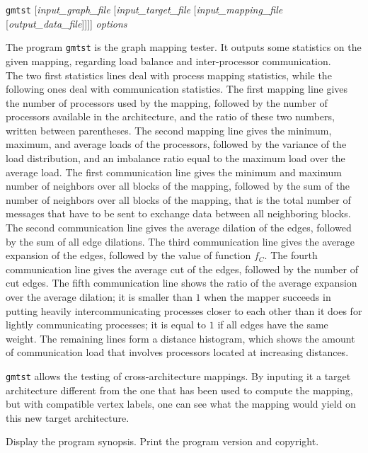 \begin{itemize}
\progsyn
\texttt{gmtst} [{\it input\_graph\_file} [{\it input\_\lbt target\_\lbt file} [{\it input\_\lbt mapping\_\lbt file} [{\it output\_\lbt data\_\lbt file}]]]] {\it options}

\progdes
The program \texttt{gmtst} is the graph mapping tester. It outputs some
statistics on the given mapping, regarding load balance and inter-processor
communication.
\\
The two first statistics lines deal with process mapping statistics, while
the following ones deal with communication statistics.
The first mapping line gives the number of processors used by
the mapping, followed by the number of processors available in the
architecture, and the ratio of these two numbers, written between parentheses.
The second mapping line gives the minimum, maximum, and average loads of the
processors, followed by the variance of the load distribution, and an imbalance
ratio equal to the maximum load over the average load.
The first communication line gives the minimum and maximum number of neighbors
over all blocks of the mapping, followed by the sum of the number of neighbors
over all blocks of the mapping, that is the total number of messages
that have to be sent to exchange data between all neighboring blocks.
The second communication line gives the average dilation of the edges,
followed by the sum of all edge dilations.
The third communication line gives the average expansion of the edges,
followed by the value of function $f_C$.
The fourth communication line gives the average cut of the edges,
followed by the number of cut edges.
The fifth communication line shows the ratio of the average expansion over
the average dilation; it is smaller than $1$ when the mapper succeeds in
putting heavily intercommunicating processes closer to each other than it
does for lightly communicating processes; it is equal to $1$ if all edges
have the same weight.
The remaining lines form a distance histogram, which shows the amount of
communication load that involves processors located at increasing distances.

\texttt{gmtst} allows the testing of cross-architecture mappings. By inputing it
a target architecture different from the one that has been used to compute the
mapping, but with compatible vertex labels, one can see what the mapping
would yield on this new target architecture.

\progopt
\begin{itemize}
\iteme[\texttt{-h}]
Display the program synopsis.
\iteme[\texttt{-V}]
Print the program version and copyright.
\end{itemize}
\end{itemize}

